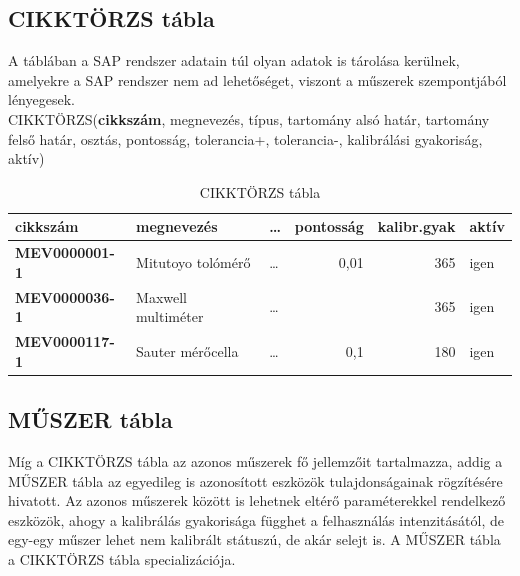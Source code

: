 \documentclass[a4paper,12pt]{report}
\newcommand{\PK}[1]{\textbf{#1}}
\newcommand{\TABLA}[1]{\noindent\MakeUppercase{#1}}
\begin{document}
\subsection{CIKKTÖRZS tábla}
A táblában a SAP rendszer adatain túl olyan adatok is tárolása kerülnek, 
amelyekre a SAP rendszer nem ad lehetőséget, viszont a műszerek
szempontjából lényegesek.\\

\TABLA{cikktörzs}(\PK{cikkszám}, megnevezés, típus, tartomány alsó határ, tartomány felső határ, osztás, pontosság, tolerancia+, tolerancia-, kalibrálási gyakoriság, aktív)

\begin{table}[ht!]
	\centering
	\begin{tabular}[t]{|l|l|l|r|r|l|}
		\hline
		\textbf{cikkszám}&megnevezés&\dots&pontosság&kalibr.gyak&aktív\\ 
		\hline
		\textbf{MEV0000001-1}&Mitutoyo tolómérő&\dots&0,01&365&igen \\
		\textbf{MEV0000036-1}&Maxwell multiméter&\dots&\,&365&igen \\
		\textbf{MEV0000117-1}&Sauter mérőcella&\dots&0,1&180&igen \\
	\end{tabular}
	\caption{CIKKTÖRZS tábla}\label{tabCIKKTORZS}
\end{table}

\subsection{MŰSZER tábla}
Míg a \TABLA{CIKKTÖRZS} tábla az azonos műszerek fő jellemzőit tartalmazza, addig a \TABLA{műszer} tábla az egyedileg is azonosított eszközök tulajdonságainak rögzítésére hivatott.
Az azonos műszerek között is lehetnek eltérő paraméterekkel rendelkező eszközök, ahogy a kalibrálás gyakorisága függhet a felhasználás intenzitásától, de egy-egy műszer lehet nem kalibrált státuszú, de akár selejt is.
A \TABLA{MŰSZER} tábla a \TABLA{cikktörzs} tábla specializációja.




%
% 
\end{document}
